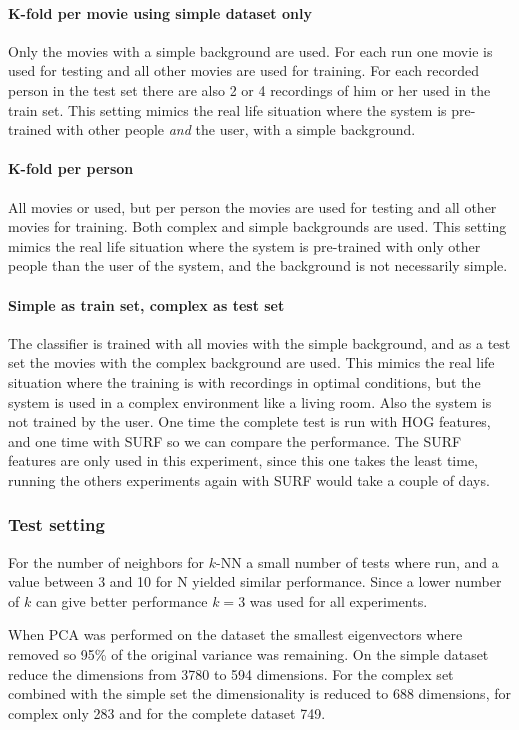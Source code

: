 \paragraph{K-fold per movie using simple dataset only}
Only the movies with a simple background are used. For each run one movie is used for testing and all other movies are used for training. For each recorded person in the test set there are also 2 or 4 recordings of him or her used in the train set. This setting mimics the real life situation where the system is pre-trained with other people \emph{and} the user, with a simple background.

\paragraph{K-fold per person}
All movies or used, but per person the movies are used for testing and all other movies for training. Both complex and simple backgrounds are used. This setting mimics the real life situation where the system is pre-trained with only other people than the user of the system, and the background is not necessarily simple. 

\paragraph{Simple as train set, complex as test set}
The classifier is trained with all movies with the simple background, and as a test set the movies with the complex background are used. This mimics the real life situation where the training is with recordings in optimal conditions, but the system is used in a complex environment like a living room. Also the system is not trained by the user. One time the complete test is run with HOG features, and one time with SURF so we can compare the performance. The SURF features are only used in this experiment, since this one takes the least time, running the others experiments again with SURF would take a couple of days.


\subsubsection{Test setting}
For the number of neighbors for $k$-NN a small number of tests where run, and a value between 3 and 10 for N yielded similar performance. Since a lower number of $k$ can give better performance $k=3$ was used for all experiments.

When PCA was performed on the dataset the smallest eigenvectors where removed so 95\% of the original variance was remaining. On the simple dataset reduce the dimensions from 3780 to 594 dimensions. For the complex set combined with the simple set the dimensionality is reduced to 688 dimensions, for complex only 283 and for the complete dataset 749.

